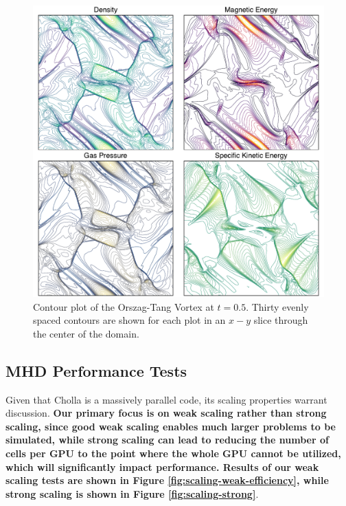 \documentclass[modern, linenumbers]{aastex631}
\newcommand*{\img}[1]{%
    \raisebox{-.05\baselineskip}{%
        \texttt{[image: \#1]}%
    }%
}
\begin{document}
\begin{figure}[!ht]
    \includegraphics[width=\linewidth]{orszag-tang-vortex.pdf}
    \caption{Contour plot of the Orszag-Tang Vortex at $t=0.5$. Thirty evenly spaced contours are shown for each plot in an $x-y$ slice through the center of the domain.  \href{https://zenodo.org/records/10927223}{\img{zenodo-gradient-200.png}}}
    \label{fig:otv}
\end{figure}

\subsection{MHD Performance Tests}
\label{sec:mhd-perf-tests}

Given that Cholla is a massively parallel code, its scaling properties warrant discussion. \textbf{Our primary focus is on weak scaling rather than strong scaling, since good weak scaling enables much larger problems to be simulated, while strong scaling can lead to reducing the number of cells per GPU to the point where the whole GPU cannot be utilized, which will significantly impact performance. Results of our weak scaling tests are shown in Figure \ref{fig:scaling-weak-efficiency}, while strong scaling is shown in Figure \ref{fig:scaling-strong}}.
\end{document}
